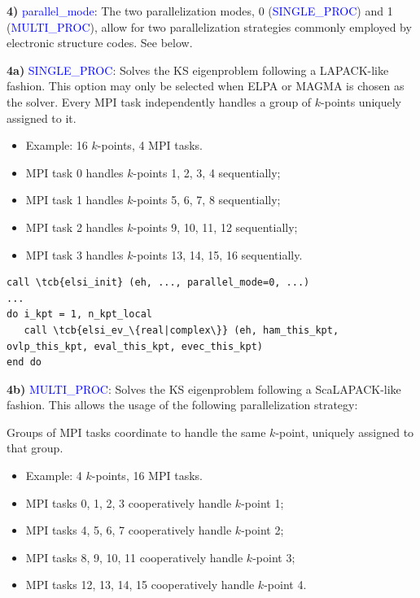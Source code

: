 \documentclass{report}
\newcommand{\tcb}[1]{\textcolor{blue}{#1}}
\begin{document}
\textbf{4)} \tcb{parallel\_mode}: The two parallelization modes, 0 (\tcb{SINGLE\_PROC}) and 1 (\tcb{MULTI\_PROC}), allow for two parallelization strategies commonly employed by electronic structure codes. See below.

\textbf{4a)} \tcb{SINGLE\_PROC}: Solves the KS eigenproblem following a LAPACK-like fashion. This option may only be selected when ELPA or MAGMA is chosen as the solver. Every MPI task independently handles a group of $k$-points uniquely assigned to it.
\begin{itemize}
\item Example: 16 $k$-points, 4 MPI tasks.
\item MPI task 0 handles $k$-points 1, 2, 3, 4 sequentially;
\item MPI task 1 handles $k$-points 5, 6, 7, 8 sequentially;
\item MPI task 2 handles $k$-points 9, 10, 11, 12 sequentially;
\item MPI task 3 handles $k$-points 13, 14, 15, 16 sequentially.
\end{itemize}

\begin{tcolorbox}
\begin{Verbatim}[commandchars=\\\{\}]
call \tcb{elsi_init} (eh, ..., parallel_mode=0, ...)
...
do i_kpt = 1, n_kpt_local
   call \tcb{elsi_ev_\{real|complex\}} (eh, ham_this_kpt, ovlp_this_kpt, eval_this_kpt, evec_this_kpt)
end do
\end{Verbatim}
\end{tcolorbox}

\textbf{4b)} \tcb{MULTI\_PROC}: Solves the KS eigenproblem following a ScaLAPACK-like fashion. This allows the usage of the following parallelization strategy:

Groups of MPI tasks coordinate to handle the same $k$-point, uniquely assigned to that group.
\begin{itemize}
\item Example: 4 $k$-points, 16 MPI tasks.
\item MPI tasks 0, 1, 2, 3 cooperatively handle $k$-point 1;
\item MPI tasks 4, 5, 6, 7 cooperatively handle $k$-point 2;
\item MPI tasks 8, 9, 10, 11 cooperatively handle $k$-point 3;
\item MPI tasks 12, 13, 14, 15 cooperatively handle $k$-point 4.
\end{itemize}
\end{document}

